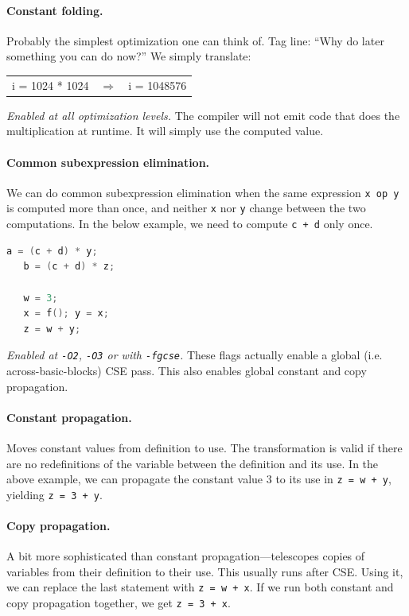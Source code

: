 \documentclass[a4paper]{report}
\begin{document}
\paragraph{Constant folding.} Probably the simplest optimization one can think of.
Tag line: ``Why do later something you can do now?'' We simply translate:

\begin{center}
\vspace*{-1em}
\begin{tabular}{lll}
i = 1024 * 1024 &
$\Longrightarrow$ &
i = 1048576
\end{tabular}
\end{center}

\noindent \emph{Enabled at all optimization levels.} The compiler will not emit
code that does the multiplication at runtime. It will simply use the
computed value.

\paragraph{Common subexpression elimination.} We can do common subexpression elimination
when the same expression {\tt x op y} is computed more than once, and
neither {\tt x} nor {\tt y} change between the two computations. In the
below example, we need to compute {\tt c + d} only once.


\begin{lstlisting}[language=C]
   a = (c + d) * y;
   b = (c + d) * z;

   w = 3;
   x = f(); y = x;
   z = w + y;

\end{lstlisting}


\noindent \emph{Enabled at {\tt -O2}, {\tt -O3} or with {\tt -fgcse}.} 
These flags actually enable a global (i.e. across-basic-blocks) CSE pass.
This also enables global constant and copy propagation.

\paragraph{Constant propagation.} Moves constant values from definition to
use. The transformation is valid if there are no redefinitions of the
variable between the definition and its use. In the above example,
we can propagate the constant value 3 to its use in {\tt z = w + y},
yielding {\tt z = 3 + y}.

\paragraph{Copy propagation.} A bit more sophisticated than constant
propagation---telescopes copies of variables from their definition to
their use. This usually runs after CSE. Using it, we can replace the
last statement with {\tt z = w + x}. If we run both constant and copy
propagation together, we get {\tt z = 3 + x}.
\end{document}
